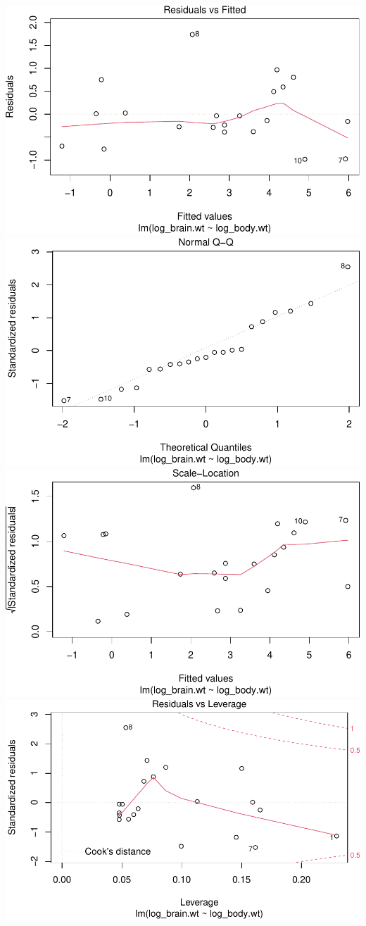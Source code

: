 \documentclass[
]{article}
\begin{document}
\includegraphics{archosaur_files/figure-latex/unnamed-chunk-4-1.pdf}
\includegraphics{archosaur_files/figure-latex/unnamed-chunk-4-2.pdf}
\includegraphics{archosaur_files/figure-latex/unnamed-chunk-4-3.pdf}
\includegraphics{archosaur_files/figure-latex/unnamed-chunk-4-4.pdf}
\end{document}
